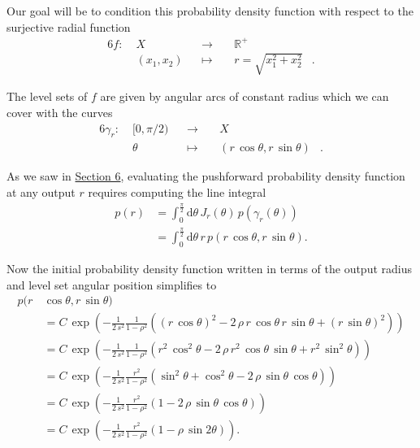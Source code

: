 \documentclass[
  letterpaper,
  DIV=11,
  numbers=noendperiod]{scrartcl}
\begin{document}
Our goal will be to condition this probability density function with
respect to the surjective radial function \begin{alignat*}{6}
f :\; &X& &\rightarrow& \; &\mathbb{R}^{+}&
\\
&(x_{1}, x_{2})& &\mapsto& &r = \sqrt{ x_{1}^{2} + x_{2}^{2} }&.
\end{alignat*}

The level sets of \(f\) are given by angular arcs of constant radius
which we can cover with the curves \begin{alignat*}{6}
\gamma_{r} :\; &[0, \pi / 2 )& &\rightarrow& \; &X&
\\
&\theta& &\mapsto& &( r \, \cos \theta, r \, \sin \theta )&.
\end{alignat*}

As we saw in \hyperref[sec:push-densities]{Section 6}, evaluating the
pushforward probability density function at any output \(r\) requires
computing the line integral \begin{align*}
p(r)
&=
\int_{0}^{ \frac{\pi}{2} } \mathrm{d} \theta \,
J_{r}(\theta) \, p( \gamma_{r}(\theta) )
\\
&=
\int_{0}^{ \frac{\pi}{2} } \mathrm{d} \theta \,
r \, p( r \, \cos \theta, r \, \sin \theta ).
\end{align*}

Now the initial probability density function written in terms of the
output radius and level set angular position simplifies to
\begin{align*}
p( r \, &\cos \theta, r \, \sin \theta )
\\
&=
C \, \exp \left(
  - \frac{1}{2 \, s^{2}} \frac{1}{1 - \rho^{2}}
    (
        (r \, \cos \theta)^{2}
      - 2 \, \rho \, r \, \cos \theta \, r \, \sin \theta
      + (r \, \sin \theta)^{2}
    )
\right)
\\
&=
C \, \exp \left(
  - \frac{1}{2 \, s^{2}} \frac{1}{1 - \rho^{2}}
(   r^{2} \, \cos^{2} \theta
  - 2 \, \rho \, r^{2} \, \cos \theta \, \sin \theta
  + r^{2} \, \sin^{2} \theta )
\right)
\\
&=
C \, \exp \left(
  - \frac{1}{2 \, s^{2}} \frac{r^{2}}{1 - \rho^{2}}
(   \sin^{2} \theta
  + \cos^{2} \theta
  - 2 \, \rho \, \sin \theta \, \cos \theta )
\right)
\\
&=
C \, \exp \left(
  - \frac{1}{2 \, s^{2}} \frac{r^{2}}{1 - \rho^{2}}
    ( 1 - 2 \, \rho \, \sin \theta \, \cos \theta )
\right)
\\
&=
C \, \exp \left(
  - \frac{1}{2 \, s^{2}} \frac{r^{2}}{1 - \rho^{2}}
  ( 1 - \rho \, \sin 2 \theta)
\right).
\end{align*}
\end{document}
